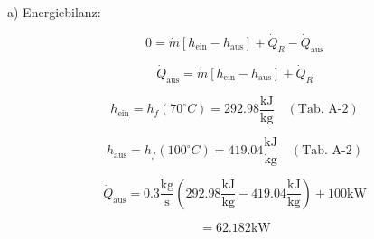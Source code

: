 a) Energiebilanz:

\[
0 = \dot{m} \left[ h_{\text{ein}} - h_{\text{aus}} \right] + \dot{Q}_R - \dot{Q}_{\text{aus}}
\]

\[
\dot{Q}_{\text{aus}} = \dot{m} \left[ h_{\text{ein}} - h_{\text{aus}} \right] + \dot{Q}_R
\]

\[
h_{\text{ein}} = h_f (70^\circ C) = 292.98 \frac{\text{kJ}}{\text{kg}} \quad (\text{Tab. A-2})
\]

\[
h_{\text{aus}} = h_f (100^\circ C) = 419.04 \frac{\text{kJ}}{\text{kg}} \quad (\text{Tab. A-2})
\]

\[
\dot{Q}_{\text{aus}} = 0.3 \frac{\text{kg}}{\text{s}} \left( 292.98 \frac{\text{kJ}}{\text{kg}} - 419.04 \frac{\text{kJ}}{\text{kg}} \right) + 100 \text{kW}
\]

\[
= 62.182 \text{kW}
\]